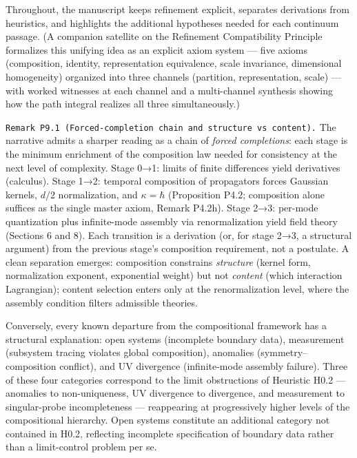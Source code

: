 \documentclass[
]{article}
\begin{document}
Throughout, the manuscript keeps refinement explicit, separates
derivations from heuristics, and highlights the additional hypotheses
needed for each continuum passage. (A companion satellite on the
Refinement Compatibility Principle formalizes this unifying idea as an
explicit axiom system --- five axioms (composition, identity,
representation equivalence, scale invariance, dimensional homogeneity)
organized into three channels (partition, representation, scale) ---
with worked witnesses at each channel and a multi-channel synthesis
showing how the path integral realizes all three simultaneously.)

\texttt{Remark\ P9.1\ (Forced-completion\ chain\ and\ structure\ vs\ content).}
The narrative admits a sharper reading as a chain of \emph{forced
completions}: each stage is the minimum enrichment of the composition
law needed for consistency at the next level of complexity. Stage 0→1:
limits of finite differences yield derivatives (calculus). Stage 1→2:
temporal composition of propagators forces Gaussian kernels, \(d/2\)
normalization, and \(\kappa=\hbar\) (Proposition P4.2; composition alone
suffices as the single master axiom, Remark P4.2h). Stage 2→3: per-mode
quantization plus infinite-mode assembly via renormalization yield field
theory (Sections 6 and 8). Each transition is a derivation (or, for
stage 2→3, a structural argument) from the previous stage's composition
requirement, not a postulate. A clean separation emerges: composition
constrains \emph{structure} (kernel form, normalization exponent,
exponential weight) but not \emph{content} (which interaction
Lagrangian); content selection enters only at the renormalization level,
where the assembly condition filters admissible theories.

Conversely, every known departure from the compositional framework has a
structural explanation: open systems (incomplete boundary data),
measurement (subsystem tracing violates global composition), anomalies
(symmetry--composition conflict), and UV divergence (infinite-mode
assembly failure). Three of these four categories correspond to the
limit obstructions of Heuristic H0.2 --- anomalies to non-uniqueness, UV
divergence to divergence, and measurement to singular-probe
incompleteness --- reappearing at progressively higher levels of the
compositional hierarchy. Open systems constitute an additional category
not contained in H0.2, reflecting incomplete specification of boundary
data rather than a limit-control problem per se.
\end{document}
